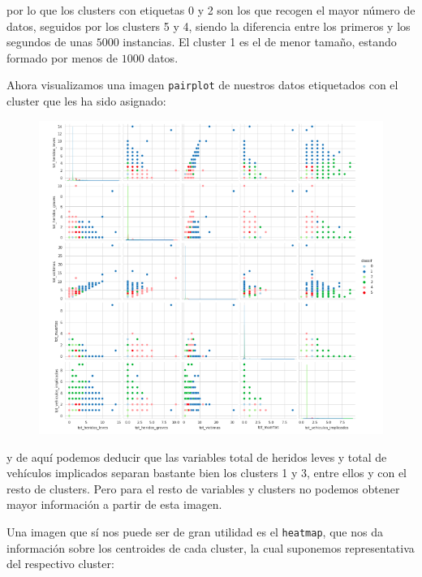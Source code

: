 \documentclass[a4paper,11pt]{book}
\begin{document}
por lo que los clusters con etiquetas 0 y 2 son los que recogen el mayor número de datos, seguidos por los clusters 5 y 4, siendo la diferencia entre los primeros y los segundos de unas $ 5000 $ instancias. El cluster 1 es el de menor tamaño, estando formado por menos de $ 1000 $ datos. 

Ahora visualizamos una imagen \texttt{pairplot} de nuestros datos etiquetados con el cluster que les ha sido asignado:
\begin{figure}[H]
	\centering
	\includegraphics[width=1\linewidth]{img/pairplot1}
	\caption{}
	\label{fig:pairplot1}
\end{figure}
y de aquí podemos deducir que las variables total de heridos leves y total de vehículos implicados separan bastante bien los clusters 1 y 3, entre ellos y con el resto de clusters. Pero para el resto de variables y clusters no podemos obtener mayor información a partir de esta imagen.

Una imagen que sí nos puede ser de gran utilidad es el \texttt{heatmap}, que nos da información sobre los centroides de cada cluster, la cual suponemos representativa del respectivo cluster:
\end{document}
